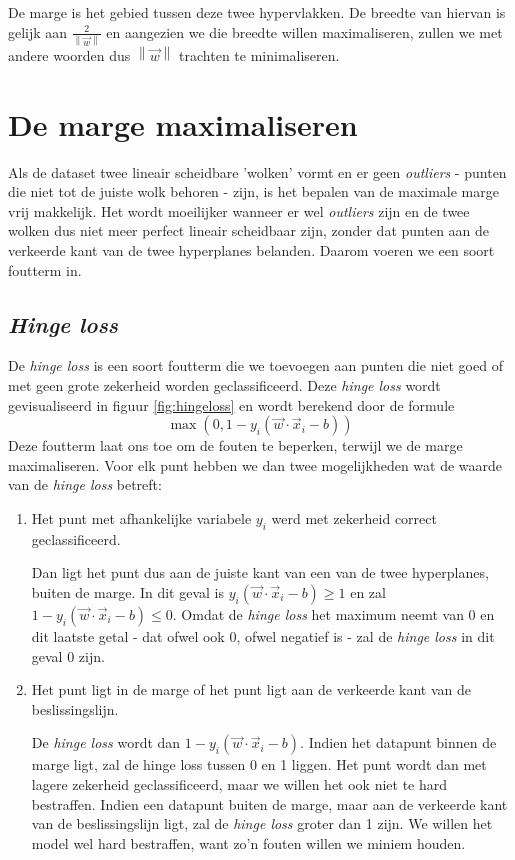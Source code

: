 \documentclass[twoside, kulak]{kulakreport}
\newcommand{\norm}[1]{\left\| #1 \right\|}
\begin{document}
	De marge is het gebied tussen deze twee hypervlakken. De breedte van hiervan is gelijk aan \(\frac{2}{\norm{\vec{w}}}\) en aangezien we die breedte willen maximaliseren, zullen we met andere woorden dus \(\norm{\vec{w}}\) trachten te minimaliseren.
	
	\section{De marge maximaliseren}
	
	Als de dataset twee lineair scheidbare 'wolken' vormt en er geen \textit{outliers} - punten die niet tot de juiste wolk behoren - zijn, is het bepalen van de maximale marge vrij makkelijk. Het wordt moeilijker wanneer er wel \textit{outliers} zijn en de twee wolken dus niet meer perfect lineair scheidbaar zijn, zonder dat punten aan de verkeerde kant van de twee hyperplanes belanden. Daarom voeren we een soort foutterm in. 
	
	\subsection{\textit{Hinge loss}}
	
	De \textit{hinge loss} is een soort foutterm die we toevoegen aan punten die niet goed of met geen grote zekerheid worden geclassificeerd. Deze \textit{hinge loss} wordt gevisualiseerd in figuur \ref{fig:hingeloss} en wordt berekend door de formule \[\max{(0,1-y_i(\vec{w}\cdot\vec{x}_i-b))}\] Deze foutterm laat ons toe om de fouten te beperken, terwijl we de marge maximaliseren. Voor elk punt hebben we dan twee mogelijkheden wat de waarde van de \textit{hinge loss} betreft:
	
	\begin{enumerate}
		\item Het punt met afhankelijke variabele \(y_i\) werd met zekerheid correct geclassificeerd.
		
		Dan ligt het punt dus aan de juiste kant van een van de twee hyperplanes, buiten de marge. In dit geval is \(y_i(\vec{w}\cdot\vec{x}_i-b)\ge1\) en zal \(1 - y_i(\vec{w}\cdot\vec{x}_i-b)\le0\). Omdat de \textit{hinge loss} het maximum neemt van 0 en dit laatste getal - dat ofwel ook 0, ofwel negatief is - zal de \textit{hinge loss} in dit geval 0 zijn.
		
		\item Het punt ligt in de marge of het punt ligt aan de verkeerde kant van de beslissingslijn. 
		
		De \textit{hinge loss} wordt dan \(1 - y_i(\vec{w}\cdot\vec{x}_i - b)\). Indien het datapunt binnen de marge ligt, zal de hinge loss tussen 0 en 1 liggen. Het punt wordt dan met lagere zekerheid geclassificeerd, maar we willen het ook niet te hard bestraffen. Indien een datapunt buiten de marge, maar aan de verkeerde kant van de beslissingslijn ligt, zal de \textit{hinge loss} groter dan 1 zijn. We willen het model wel hard bestraffen, want zo'n fouten willen we miniem houden.
	\end{enumerate}
	
\end{document}
